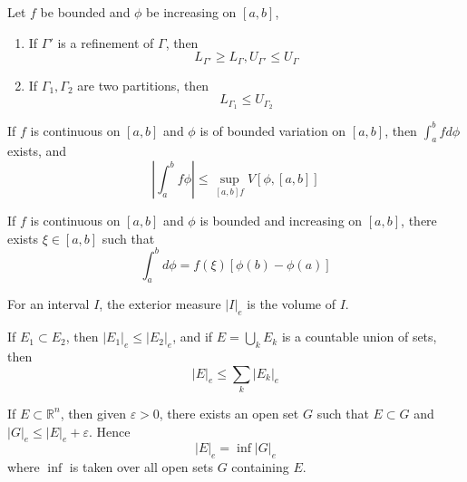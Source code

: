 \documentclass[openany]{book}
\newcommand{\R}{\mathbb{R}}
\begin{document}
\begin{prop}
    Let $f$ be bounded and $\phi$ be increasing on $[a,b]$, 
    \begin{enumerate}
        \item If $\Gamma'$ is a refinement of $\Gamma$, then 
        \begin{equation*}
            L_{\Gamma'}\geq L_\Gamma, U_{\Gamma'}\leq U_{\Gamma}
        \end{equation*}
        \item If $\Gamma_1,\Gamma_2$ are two partitions, then 
        \begin{equation*}
            L_{\Gamma_1}\leq U_{\Gamma_2}
        \end{equation*}
    \end{enumerate}
\end{prop}
\begin{prop}
    If $f$ is continuous on $[a,b]$ and $\phi$ is of bounded variation on $[a,b]$, then $\int_a^bfd\phi$ exists, and 
    \begin{equation*}
        \left|\int_a^bf\phi\right|\leq\sup_{[a,b]f}V[\phi,[a,b]]
    \end{equation*}
\end{prop}
\begin{thm}
    If $f$ is continuous on $[a,b]$ and $\phi$ is bounded and increasing on $[a,b]$, there exists $\xi\in [a,b]$ such that 
    \begin{equation*}
        \int_a^bd\phi=f(\xi)[\phi(b)-\phi(a)]
    \end{equation*}
\end{thm}
\begin{prop}
    For an interval $I$, the exterior measure $|I|_e$ is the volume of $I$.
\end{prop}
\begin{prop}
    If $E_1\subset E_2$, then $|E_1|_e\leq|E_2|_e$, and if $E=\bigcup_kE_k$ is a countable union of sets, then 
    \begin{equation*}
        |E|_e\leq\sum_{k}|E_k|_e
    \end{equation*}
\end{prop}
\begin{thm}
    If $E\subset\R^n$, then given $\varepsilon>0$, there exists an open set $G$ such that $E\subset G$ and $|G|_e\leq |E|_e+\varepsilon$. Hence 
    \begin{equation*}
        |E|_e=\inf|G|_e
    \end{equation*}
    where $\inf$ is taken over all open sets $G$ containing $E$.
\end{thm}
\end{document}
